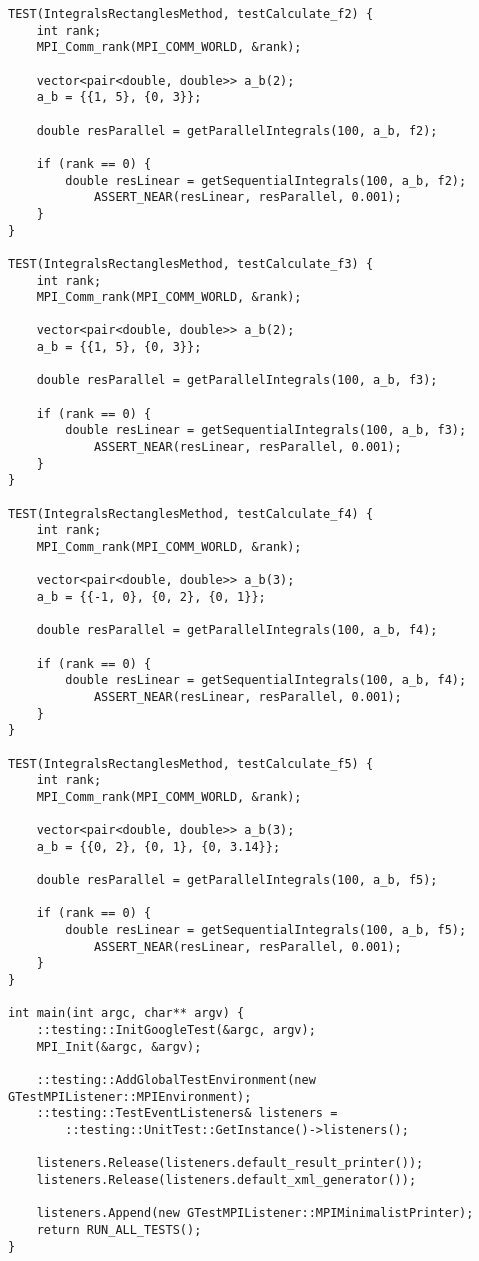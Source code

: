 \documentclass{report}
\begin{document}
\begin{lstlisting}
TEST(IntegralsRectanglesMethod, testCalculate_f2) {
    int rank;
    MPI_Comm_rank(MPI_COMM_WORLD, &rank);

    vector<pair<double, double>> a_b(2);
    a_b = {{1, 5}, {0, 3}};

    double resParallel = getParallelIntegrals(100, a_b, f2);

    if (rank == 0) {
        double resLinear = getSequentialIntegrals(100, a_b, f2);
            ASSERT_NEAR(resLinear, resParallel, 0.001);
    }
}

TEST(IntegralsRectanglesMethod, testCalculate_f3) {
    int rank;
    MPI_Comm_rank(MPI_COMM_WORLD, &rank);

    vector<pair<double, double>> a_b(2);
    a_b = {{1, 5}, {0, 3}};

    double resParallel = getParallelIntegrals(100, a_b, f3);

    if (rank == 0) {
        double resLinear = getSequentialIntegrals(100, a_b, f3);
            ASSERT_NEAR(resLinear, resParallel, 0.001);
    }
}

TEST(IntegralsRectanglesMethod, testCalculate_f4) {
    int rank;
    MPI_Comm_rank(MPI_COMM_WORLD, &rank);

    vector<pair<double, double>> a_b(3);
    a_b = {{-1, 0}, {0, 2}, {0, 1}};

    double resParallel = getParallelIntegrals(100, a_b, f4);

    if (rank == 0) {
        double resLinear = getSequentialIntegrals(100, a_b, f4);
            ASSERT_NEAR(resLinear, resParallel, 0.001);
    }
}

TEST(IntegralsRectanglesMethod, testCalculate_f5) {
    int rank;
    MPI_Comm_rank(MPI_COMM_WORLD, &rank);

    vector<pair<double, double>> a_b(3);
    a_b = {{0, 2}, {0, 1}, {0, 3.14}};

    double resParallel = getParallelIntegrals(100, a_b, f5);

    if (rank == 0) {
        double resLinear = getSequentialIntegrals(100, a_b, f5);
            ASSERT_NEAR(resLinear, resParallel, 0.001);
    }
}

int main(int argc, char** argv) {
    ::testing::InitGoogleTest(&argc, argv);
    MPI_Init(&argc, &argv);

    ::testing::AddGlobalTestEnvironment(new GTestMPIListener::MPIEnvironment);
    ::testing::TestEventListeners& listeners =
        ::testing::UnitTest::GetInstance()->listeners();

    listeners.Release(listeners.default_result_printer());
    listeners.Release(listeners.default_xml_generator());

    listeners.Append(new GTestMPIListener::MPIMinimalistPrinter);
    return RUN_ALL_TESTS();
}

\end{lstlisting}
\end{document}
